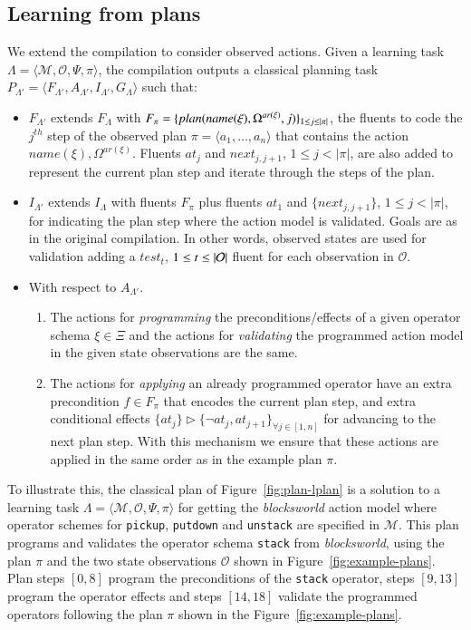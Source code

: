 \documentclass[3p,times]{elsarticle}
\newcommand{\tup}[1]{{\langle #1 \rangle}}
\begin{document}
\subsection{Learning from plans}
We extend the compilation to consider observed actions. Given a learning task $\Lambda=\tup{\mathcal{M},\mathcal{O},\Psi,\pi}$, the compilation outputs a classical planning task $P_{\Lambda'}=\tup{F_{\Lambda'},A_{\Lambda'},I_{\Lambda'},G_{\Lambda}}$ such that:
\begin{itemize}
\item $F_{\Lambda'}$ extends $F_{\Lambda}$ with $F_{\pi}=\{plan(name(\xi),\Omega^{ar(\xi)},j)\}_{\small 1\leq j\leq |\pi|}$, the fluents to code the $j^{th}$ step of the observed plan $\pi=\tup{a_1, \ldots, a_n}$ that contains the action $name(\xi),\Omega^{ar(\xi)}$. Fluents $at_j$ and $next_{j,j+1}$, {\small $1\leq j< |\pi|$}, are also added to represent the current plan step and iterate through the steps of the plan.
\item $I_{\Lambda'}$ extends $I_{\Lambda}$ with fluents $F_{\pi}$ plus fluents $at_1$ and $\{next_{j,j+1}\}$, {\small $1\leq j<|\pi|$}, for indicating the plan step where the action model is validated. Goals are as in the original compilation. In other words, observed states are used for validation adding a $test_t$, ${\small 1\leq t\leq |\mathcal{O}|}$ fluent for each observation in $\mathcal{O}$.
\item With respect to $A_{\Lambda'}$.
\begin{enumerate}
\item The actions for {\em programming} the preconditions/effects of a given operator schema $\xi\in\Xi$ and the actions for {\em validating} the programmed action model in the given state observations are the same.
\item The actions for {\em applying} an already programmed operator have an extra precondition $f\in F_{\pi}$ that encodes the current plan step, and extra conditional effects $\{at_{j}\}\rhd\{\neg at_{j},at_{j+1}\}_{\forall j\in [1,n]}$ for advancing to the next plan step. With this mechanism we ensure that these actions are applied in the same order as in the example plan $\pi$.
\end{enumerate}
\end{itemize}

To illustrate this, the classical plan of Figure~\ref{fig:plan-lplan} is a solution to a learning task $\Lambda=\tup{\mathcal{M},\mathcal{O},\Psi,\pi}$ for getting the {\em blocksworld} action model where operator schemes for {\tt\small pickup}, {\tt\small putdown} and {\tt\small unstack} are specified in $\mathcal{M}$. This plan programs and validates the operator schema {\tt\small stack} from {\em blocksworld}, using the plan $\pi$ and the two state observations $\mathcal{O}$ shown in Figure~\ref{fig:example-plans}. Plan steps $[0,8]$ program the preconditions of the {\tt\small stack} operator, steps $[9,13]$ program the operator effects and steps $[14,18]$ validate the programmed operators following the plan $\pi$ shown in the Figure~\ref{fig:example-plans}.
\end{document}
